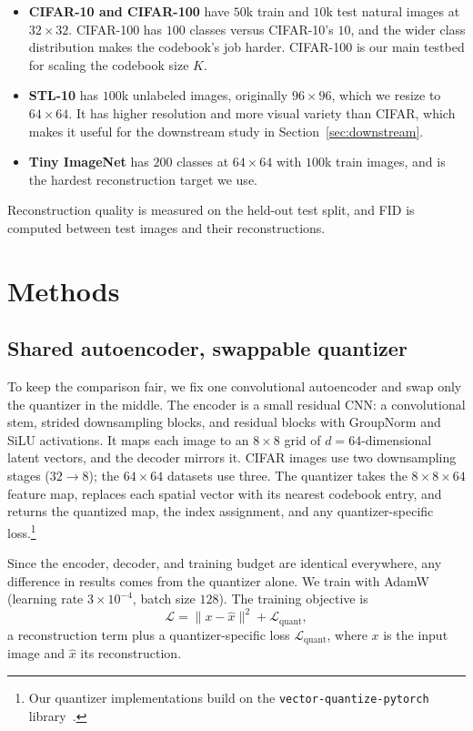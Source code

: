 \documentclass[10pt,twocolumn,letterpaper]{article}
\begin{document}
\begin{itemize}\itemsep2pt
  \item \textbf{CIFAR-10 and CIFAR-100} \cite{cifar} have $50$k train and $10$k
  test natural images at $32{\times}32$. CIFAR-100 has $100$ classes versus
  CIFAR-10's $10$, and the wider class distribution makes the codebook's job harder.
  CIFAR-100 is our main testbed for scaling the codebook size $K$.
  \item \textbf{STL-10} \cite{stl10} has $100$k unlabeled images, originally
  $96{\times}96$, which we resize to $64{\times}64$. It has higher resolution and
  more visual variety than CIFAR, which makes it useful for the downstream study in
  Section~\ref{sec:downstream}.
  \item \textbf{Tiny ImageNet} \cite{tinyimagenet} has $200$ classes at
  $64{\times}64$ with $100$k train images, and is the hardest reconstruction target
  we use.
\end{itemize}

\noindent Reconstruction quality is measured on the held-out test split, and FID is
computed between test images and their reconstructions.

\section{Methods}
\label{sec:methods}

\subsection{Shared autoencoder, swappable quantizer}

To keep the comparison fair, we fix one convolutional autoencoder and swap only the
quantizer in the middle. The encoder is a small residual CNN: a convolutional stem,
strided downsampling blocks, and residual blocks with GroupNorm and SiLU activations.
It maps each image to an $8{\times}8$ grid of $d{=}64$-dimensional latent vectors, and
the decoder mirrors it. CIFAR images use two downsampling stages ($32{\to}8$); the
$64{\times}64$ datasets use three. The quantizer takes the $8{\times}8{\times}64$
feature map, replaces each spatial vector with its nearest codebook entry, and returns
the quantized map, the index assignment, and any quantizer-specific
loss.\footnote{Our quantizer implementations build on the
\texttt{vector-quantize-pytorch} library~\cite{lucidrains_vqpytorch}.}

Since the encoder, decoder, and training budget are identical everywhere, any
difference in results comes from the quantizer alone. We train with AdamW (learning
rate $3\!\times\!10^{-4}$, batch size $128$). The training objective is
\begin{equation}
\mathcal{L} = \|x - \hat{x}\|^2 + \mathcal{L}_{\mathrm{quant}},
\label{eq:objective}
\end{equation}
a reconstruction term plus a quantizer-specific loss $\mathcal{L}_{\mathrm{quant}}$,
where $x$ is the input image and $\hat{x}$ its reconstruction.
\end{document}
